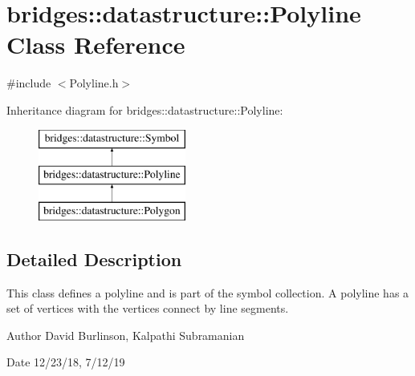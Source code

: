 \hypertarget{classbridges_1_1datastructure_1_1_polyline}{}\section{bridges\+::datastructure\+::Polyline Class Reference}
\label{classbridges_1_1datastructure_1_1_polyline}


{\ttfamily \#include $<$Polyline.\+h$>$}

Inheritance diagram for bridges\+::datastructure\+::Polyline\+:\begin{figure}[H]
\begin{center}
\leavevmode
\includegraphics[height=3.000000cm]{classbridges_1_1datastructure_1_1_polyline}
\end{center}
\end{figure}


\subsection{Detailed Description}
This class defines a polyline and is part of the symbol collection. A polyline has a set of vertices with the vertices connect by line segments. 

\begin{DoxyAuthor}{Author}
David Burlinson, Kalpathi Subramanian 
\end{DoxyAuthor}
\begin{DoxyDate}{Date}
12/23/18, 7/12/19 
\end{DoxyDate}
